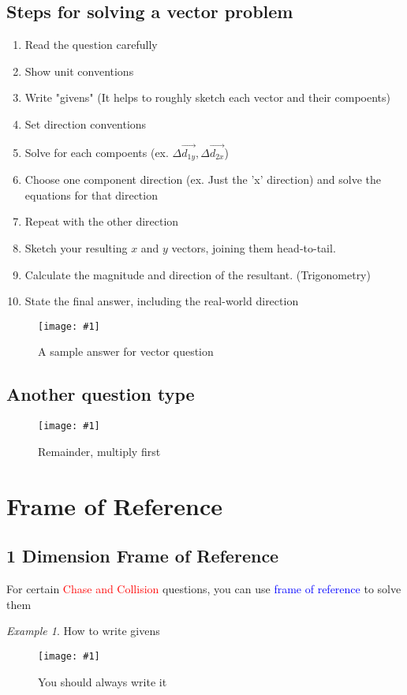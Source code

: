 \documentclass[10pt]{report}
\theoremstyle{remark}
\newtheorem*{example}{Example}
\newcommand{\mypic}[3]{
    \begin{figure}[h!]
        \centering
        \texttt{[image: \#1]}
        \caption{#2}
    \end{figure}
}
\begin{document}
\subsection{Steps for solving a vector problem}
\begin{enumerate}
    \item Read the question carefully
    \item Show unit conventions
    \item Write "givens" (It helps to roughly sketch each vector and their compoents)
    \item Set direction conventions
    \item Solve for each compoents (ex. $\Delta\vec{d_{1y}}, \Delta\vec{d_{2x}}$)
    \item Choose one component direction (ex. Just the 'x' direction) and solve the equations for that direction
    \item Repeat with the other direction
    \item Sketch your resulting $x$ and $y$ vectors, joining them head-to-tail. 
    \item Calculate the magnitude and direction of the resultant. (Trigonometry)
    \item State the final answer, including the real-world direction
\end{enumerate}

\mypic{graph/graph1.png}{A sample answer for vector question}{0.8}

\subsection{Another question type}
\mypic{graph/teacherNote2.png}{Remainder, multiply first}{0.9}

\newpage
\section{Frame of Reference}
\subsection{1 Dimension Frame of Reference}
For certain \textcolor{red}{Chase and Collision} questions, you can use \textcolor{blue}{frame of reference} 
to solve them
\begin{example}
    How to write givens\\
    \mypic{graph/graph2.png}{You should always write it}{0.7}
\end{example}
\newpage
\end{document}
